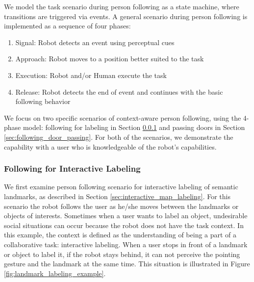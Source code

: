 \documentclass{tADR2e}
\begin{document}
We model the task scenario during person following as a state machine, where transitions are triggered via events. A general scenario during person following is implemented as a sequence of four phases:

\begin{enumerate}
\item Signal: Robot detects an event using perceptual cues
\item Approach: Robot moves to a position better suited to the task
\item Execution: Robot and/or Human execute the task
\item Release: Robot detects the end of event and continues with the basic following behavior
\end{enumerate}

We focus on two specific scenarios of context-aware person following, using the 4-phase model: following for labeling in Section \ref{sec:following_for labeling} and passing doors in Section \ref{sec:following_door_passing}. For both of the scenarios, we demonstrate the capability with a user who is knowledgeable of the robot's capabilities.

\subsubsection{Following for Interactive Labeling}
\label{sec:following_for labeling}

We first examine person following scenario for interactive labeling of semantic landmarks, as described in Section \ref{sec:interactive_map_labeling}. For this scenario the robot follows the user as he/she moves between the landmarks or objects of interests. Sometimes when a user wants to label an object, undesirable social situations can occur because the robot does not have the task context. In this example, the context is defined as the understanding of being a part of a collaborative task: interactive labeling. When a user stops in front of a landmark or object to label it, if the robot stays behind, it can not perceive the pointing gesture and the landmark at the same time. This situation is illustrated in Figure \ref{fig:landmark_labeling_example}. 
\end{document}
